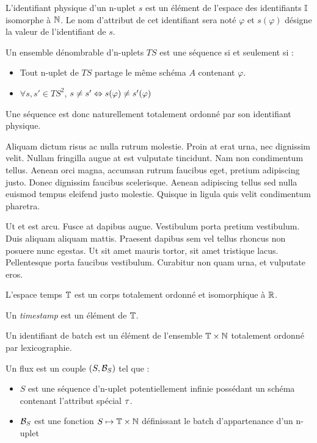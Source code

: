     L'identifiant physique d'un n-uplet $s$ est un élément de l'espace des identifiants $\mathbb{I}$ isomorphe à $\mathbb{N}$. Le nom d'attribut de cet identifiant sera noté $\varphi$ et $s(\varphi)$ désigne la valeur de l'identifiant de $s$.

\begin{defi}
    Un ensemble dénombrable d'n-uplets $TS$ est une séquence si et seulement si : 
    \begin{itemize}
     \item Tout n-uplet de $TS$ partage le même schéma $A$ contenant $\varphi$.
     \item $\forall s,s' \in TS^2$, $s\neq s' \Leftrightarrow s(\varphi) \neq s'(\varphi)$
    \end{itemize}

    Une séquence est donc naturellement totalement ordonné par son identifiant physique.
\end{defi}
Aliquam dictum risus ac nulla rutrum molestie. Proin at erat urna, nec dignissim velit. Nullam fringilla augue at est vulputate tincidunt. Nam non condimentum tellus. Aenean orci magna, accumsan rutrum faucibus eget, pretium adipiscing justo. Donec dignissim faucibus scelerisque. Aenean adipiscing tellus sed nulla euismod tempus eleifend justo molestie. Quisque in ligula quis velit condimentum pharetra.

Ut et est arcu. Fusce at dapibus augue. Vestibulum porta pretium vestibulum. Duis aliquam aliquam mattis. Praesent dapibus sem vel tellus rhoncus non posuere nunc egestas. Ut sit amet mauris tortor, sit amet tristique lacus. Pellentesque porta faucibus vestibulum. Curabitur non quam urna, et vulputate eros. 

\begin{prop}[Timestamp]
    L'espace temps $\mathbb{T}$ est un corps totalement ordonné et isomorphique à $\mathbb{R}$. 

    Un \textit{timestamp} est un élément de $\mathbb{T}$.
\end{prop}


\begin{thm}
    Un identifiant de batch est un élément de l'ensemble $\mathbb{T}\times\mathbb{N}$ totalement ordonné par lexicographie.
\end{thm}

\begin{coro}[Flux]
    Un flux est un couple $(S,\mathcal{B}_S)$ tel que :
    \begin{itemize}
        \item $S$ est une séquence d'n-uplet potentiellement infinie possédant un schéma contenant l'attribut spécial $\tau$.
        \item $\mathcal{B}_S$ est une fonction $S\mapsto \mathbb{T}\times\mathbb{N}$ définissant le batch d'appartenance d'un n-uplet
    \end{itemize}
\end{coro}

